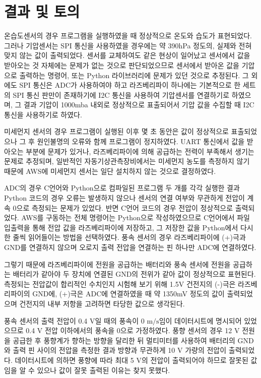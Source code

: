 \section{결과 및 토의}

온습도센서의 경우 프로그램을 실행하였을 때 정상적으로 온도와 습도가 표현되었다. 그러나 기압센서는 SPI 통신을 사용하였을 경우에는 약 390hPa 정도의, 실제와 전혀 맞지 않는 값이 출력되었다. 센서를 교체하여도 같은 현상이 일어났고 센서에서 값을 받아오는 것 자체에는 문제가 없는 것으로 판단되었으므로 센서에서 받아온 값을 기압으로 출력하는 명령어, 또는 Python 라이브러리에 문제가 있던 것으로 추정된다. 그 외에도 SPI 통신은 ADC가 사용하여야 하고 라즈베리파이 하나에는 기본적으로 한 세트의 SPI 통신 판만이 존재하기에 I2C 통신을 사용하여 기압센서를 연결하기로 하였으며, 그 결과 기압이 1000mba 내외로 정상적으로 표출되어서 기압 값을 수집할 때 I2C 통신을 사용하기로 하였다. 

미세먼지 센서의 경우 프로그램이 실행된 이후 몇 초 동안은 값이 정상적으로 표출되었으나 그 후 원인불명의 오류와 함께 프로그램이 정지하였다. UART 통신에서 값을 받아오는 부분에 문제가 있거나, 라즈베리파이에 의해 공급하는 전력이 부족해서 생기는 문제로 추정되며, 일반적인 자동기상관측장비에서는 미세먼지 농도를 측정하지 않기 때문에 AWS에 미세먼지 센서는 일단 설치하지 않는 것으로 결정하였다. 

ADC의 경우 C언어와 Python으로 컴파일된 프로그램 두 개를 각각 실행한 결과 Python 코드의 경우 오류는 발생하지 않으나 센서의 연결 여부와 무관하게 전압이 계속 0으로 측정되는 문제가 있었다. 반면 C언어 코드의 경우 전압이 정상적으로 출력되었다. AWS를 구동하는 전체 명령어는 Python으로 작성하였으므로 C언어에서 파일 입출력을 통해 전압 값을 라즈베리파이에 저장하고, 그 저장한 값을 Python에서 다시 한 줄씩 읽어들이는 방법을 선택하였다. 풍속 센서의 경우 라즈베리파이에 (+)극과 GND를 연결하지 않으며 오로지 출력 전압을 연결하는 핀 하나만 ADC에 연결하였다. 

그렇기 때문에 라즈베리파이에 전원을 공급하는 배터리와 풍속 센서에 전원을 공급하는 배터리가 같아야 두 장치에 연결된 GND의 전위가 같아 값이 정상적으로 표현된다. 측정되는 전압값이 합리적인 수치인지 시험해 보기 위해 1.5V 건전지의 (-)극은 라즈베리파이의 GND에, (+)극은 ADC에 연결하였을 때 약 1350mV 정도의 값이 출력되었으며 건전지의 내부 저항을 고려하면 타당한 값으로 생각된다. 

풍속 센서의 출력 전압이 0.4 $\textrm{V}$일 때의 풍속이 0 $\textrm{m/s}$임이 데이터시트에 명시되어 있었으므로 0.4 $\textrm{V}$ 전압 이하에서의 풍속을 0으로 가정하였다. 풍향 센서의 경우 12 $\textrm{V}$ 전원을 공급한 후 풍향계가 향하는 방향을 달리한 뒤 멀티미터를 사용하여 배터리의 GND와 출력 핀 사이의 전압을 측정한 결과 방향과 무관하게 10 $\textrm{V}$ 가량의 전압이 출력되었다. 데이터시트에 의하면 풍향에 따라 최대 5 $\textrm{V}$의 전압이 출력되어야 하므로 잘못된 값임을 알 수 있으나 값이 잘못 출력된 이유는 찾지 못했다. 

